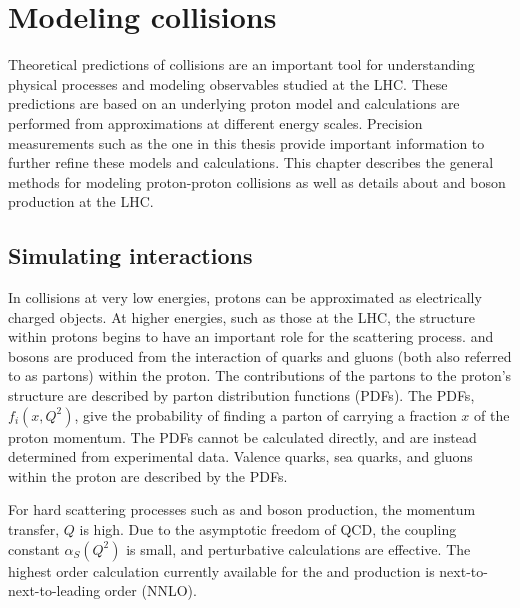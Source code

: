 \section{Modeling \pp collisions}
Theoretical predictions of \pp collisions are an important tool for understanding physical processes and modeling observables studied at the LHC. These predictions are based on an underlying proton model and calculations are performed from approximations at different energy scales. Precision measurements such as the one in this thesis provide important information to further refine these models and calculations. This chapter describes the general methods for modeling proton-proton collisions as well as details about \W and \Z boson production at the LHC.
\subsection{Simulating \pp interactions}
In collisions at very low energies, protons can be approximated as electrically charged objects. At higher energies, such as those at the LHC, the structure within protons begins to have an important role for the scattering process. \W and \Z bosons are produced from the interaction of quarks and gluons (both also referred to as partons) within the proton\cite{PhysRevLett.23.930,PhysRevLett.23.935}. The contributions of the partons to the proton's structure are described by parton distribution functions (PDFs). The PDFs, $f_i(x,Q^2)$, give the probability of finding a parton of carrying a fraction $x$ of the proton momentum. The PDFs cannot be calculated directly, and are instead determined from experimental data. Valence quarks, sea quarks, and gluons within the proton are described by the PDFs. 

For hard scattering processes such as \W and \Z boson production, the momentum transfer, $Q$ is high. Due to the asymptotic freedom of QCD, the coupling constant $\alpha_S(Q^2)$ is small, and perturbative calculations are effective. The highest order calculation currently available for the \W and \Z production is next-to-next-to-leading order (NNLO)\cite{Anastasiou:2003ds}. 


